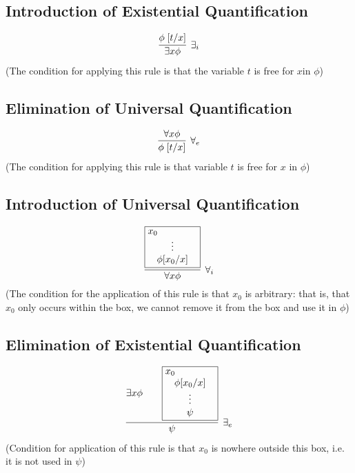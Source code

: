 \documentclass{article}
\newcommand{\rulename}[1]{#1}
\newcommand{\hint}[1]{#1}
\newcommand{\myex}[2]{\exists #1 #2}
\newcommand{\myall}[2]{\forall #1 #2}
\begin{document}
\subsection*{Introduction of Existential Quantification}
    \begin{align*}
      \infer[\rulename{\exists_i}]
      {\myex{x}{\phi}}
      {\phi\;[t/x]}
    \end{align*}
    (The condition for applying this rule is that the variable $t$ is free for $x$in $\phi$) %

\subsection*{Elimination of Universal Quantification}
    \begin{align*}
      \infer[\rulename{\forall_e}]
      {\phi\;[t/x]}
      {\myall{x}{\phi}}
    \end{align*}
    (The condition for applying this rule is that variable $t$ is free for $x$ in $\phi$)
\subsection*{Introduction of Universal Quantification}
    \begin{equation*}
      \infer[\rulename{\forall_i}]
      {\forall x \phi}
      {
        \framebox{\parbox{1.8cm}{\hint{$x_0$}
        \centerline{\vdots}
        \centerline{$\phi[x_0/x]$}}}
      }
    \end{equation*}
    (The condition for the application of this rule is that $x_0$ is arbitrary: that is, that $x_0$ only occurs within the box, we cannot remove it from the box and use it in $\phi$)
    
\subsection*{Elimination of Existential Quantification}
    \begin{align*}
      \infer[\rulename{\exists_e}]
      {\psi}
      {
        \myex{x}{\phi} &&
        \framebox{\parbox{1.8cm}{\hint{$x_0$}\\\centerline{$\phi[x_0/x]$}\\\centerline{$\vdots$}\\\centerline{$\psi$}}}
      }
    \end{align*}
    (Condition for application of this rule is that $x_0$ is nowhere outside this box, i.e. it is not used in $\psi$)
\end{document}
